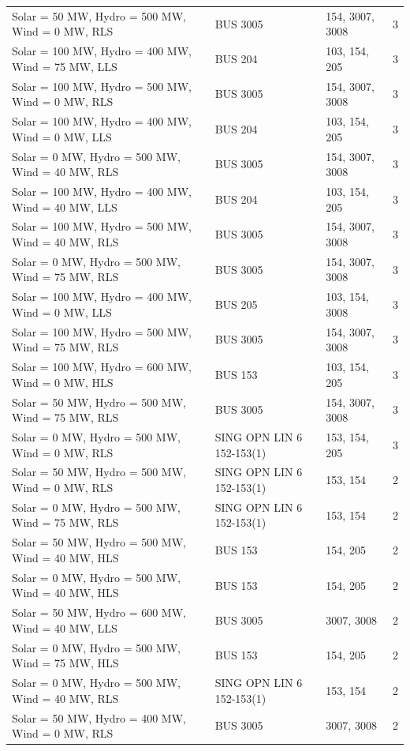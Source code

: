 \documentclass[10pt]{report}
\begin{document}
\begin{table}[H]
{\begin{tabular}{llp{8cm}r}
Solar = 50 MW, Hydro = 500 MW, Wind = 0 MW, RLS & BUS 3005 & 154, 3007, 3008 & 3 \\
Solar = 100 MW, Hydro = 400 MW, Wind = 75 MW, LLS & BUS 204 & 103, 154, 205 & 3 \\
Solar = 100 MW, Hydro = 500 MW, Wind = 0 MW, RLS & BUS 3005 & 154, 3007, 3008 & 3 \\
Solar = 100 MW, Hydro = 400 MW, Wind = 0 MW, LLS & BUS 204 & 103, 154, 205 & 3 \\
Solar = 0 MW, Hydro = 500 MW, Wind = 40 MW, RLS & BUS 3005 & 154, 3007, 3008 & 3 \\
Solar = 100 MW, Hydro = 400 MW, Wind = 40 MW, LLS & BUS 204 & 103, 154, 205 & 3 \\
Solar = 100 MW, Hydro = 500 MW, Wind = 40 MW, RLS & BUS 3005 & 154, 3007, 3008 & 3 \\
Solar = 0 MW, Hydro = 500 MW, Wind = 75 MW, RLS & BUS 3005 & 154, 3007, 3008 & 3 \\
Solar = 100 MW, Hydro = 400 MW, Wind = 0 MW, LLS & BUS 205 & 103, 154, 3008 & 3 \\
Solar = 100 MW, Hydro = 500 MW, Wind = 75 MW, RLS & BUS 3005 & 154, 3007, 3008 & 3 \\
Solar = 100 MW, Hydro = 600 MW, Wind = 0 MW, HLS & BUS 153 & 103, 154, 205 & 3 \\
Solar = 50 MW, Hydro = 500 MW, Wind = 75 MW, RLS & BUS 3005 & 154, 3007, 3008 & 3 \\
Solar = 0 MW, Hydro = 500 MW, Wind = 0 MW, RLS & SING OPN LIN   6 152-153(1) & 153, 154, 205 & 3 \\
Solar = 50 MW, Hydro = 500 MW, Wind = 0 MW, RLS & SING OPN LIN   6 152-153(1) & 153, 154 & 2 \\
Solar = 0 MW, Hydro = 500 MW, Wind = 75 MW, RLS & SING OPN LIN   6 152-153(1) & 153, 154 & 2 \\
Solar = 50 MW, Hydro = 500 MW, Wind = 40 MW, HLS & BUS 153 & 154, 205 & 2 \\
Solar = 0 MW, Hydro = 500 MW, Wind = 40 MW, HLS & BUS 153 & 154, 205 & 2 \\
Solar = 50 MW, Hydro = 600 MW, Wind = 40 MW, LLS & BUS 3005 & 3007, 3008 & 2 \\
Solar = 0 MW, Hydro = 500 MW, Wind = 75 MW, HLS & BUS 153 & 154, 205 & 2 \\
Solar = 0 MW, Hydro = 500 MW, Wind = 40 MW, RLS & SING OPN LIN   6 152-153(1) & 153, 154 & 2 \\
Solar = 50 MW, Hydro = 400 MW, Wind = 0 MW, RLS & BUS 3005 & 3007, 3008 & 2 \\
\bottomrule
\end{tabular}}
\end{table}
\end{document}
